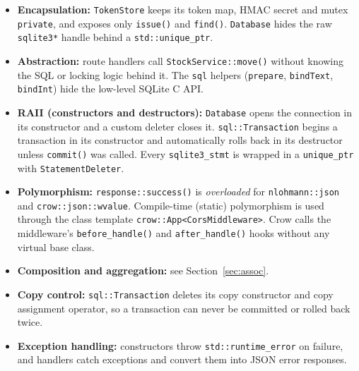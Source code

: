 \documentclass[12pt,a4paper,oneside]{book}
\begin{document}
\begin{itemize}
  \item \textbf{Encapsulation:} \texttt{TokenStore} keeps its token map, HMAC secret and mutex
    \texttt{private}, and exposes only \texttt{issue()} and \texttt{find()}. \texttt{Database}
    hides the raw \texttt{sqlite3*} handle behind a \texttt{std::unique\_ptr}.
  \item \textbf{Abstraction:} route handlers call \texttt{StockService::move()} without knowing
    the SQL or locking logic behind it. The \texttt{sql} helpers (\texttt{prepare}, \texttt{bindText},
    \texttt{bindInt}) hide the low-level SQLite C API.
  \item \textbf{RAII (constructors and destructors):} \texttt{Database} opens the connection in its
    constructor and a custom deleter closes it. \texttt{sql::Transaction} begins a transaction
    in its constructor and automatically rolls back in its destructor unless \texttt{commit()}
    was called. Every \texttt{sqlite3\_stmt} is wrapped in a \texttt{unique\_ptr} with
    \texttt{StatementDeleter}.
  \item \textbf{Polymorphism:} \texttt{response::success()} is \emph{overloaded} for
    \texttt{nlohmann::json} and \texttt{crow::json::wvalue}. Compile-time (static) polymorphism is
    used through the class template
    \texttt{crow::App<CorsMiddleware>}. Crow calls the middleware's
    \texttt{before\_handle()} and \texttt{after\_handle()} hooks without any virtual base class.
  \item \textbf{Composition and aggregation:} see Section~\ref{sec:assoc}.
  \item \textbf{Copy control:} \texttt{sql::Transaction} deletes its copy constructor and copy
    assignment operator, so a transaction can never be committed or rolled back twice.
  \item \textbf{Exception handling:} constructors throw \texttt{std::runtime\_error} on failure,
    and handlers catch exceptions and convert them into JSON error responses.
\end{itemize}
\end{document}
